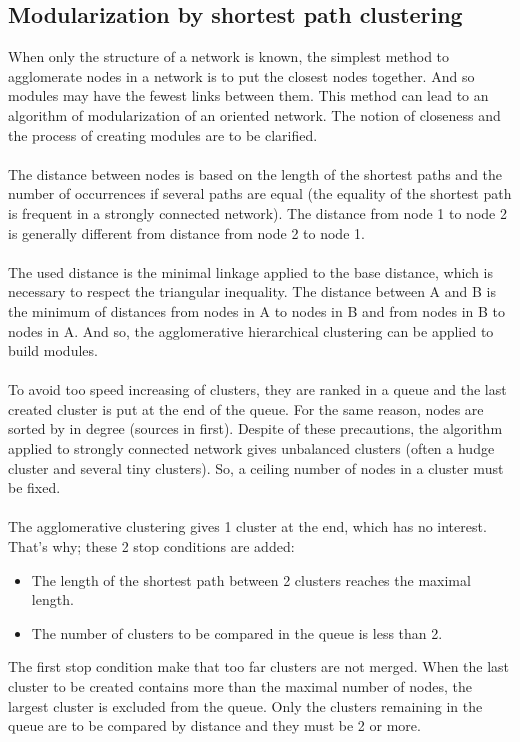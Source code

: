 \subsection{Modularization by shortest path clustering}\label{Agglomeration_by_shortest_path}
When only the structure of a network is known, the simplest method to agglomerate nodes in a network is to put the closest nodes together. And so modules may have the fewest links between them. This method can lead to an algorithm of modularization of an oriented network. The notion of closeness and the process of creating modules are to be clarified.\\\\
The distance between nodes is based on the length of the shortest paths and the number of occurrences if several paths are equal (the equality of the shortest path is frequent in a strongly connected network). The distance from node 1 to node 2 is generally different from distance from node 2 to node 1.\\\\
The used distance is the minimal linkage applied to the base distance, which is necessary to respect the triangular inequality. The distance between A and B is the minimum of distances from nodes in A to nodes in B and from nodes in B to nodes in A. And so, the agglomerative hierarchical clustering can be applied to build modules.\\\\
To avoid too speed increasing of clusters, they are ranked in a queue and the last created cluster is put at the end of the queue. For the same reason, nodes are sorted by in degree (sources in first). Despite of these precautions, the algorithm applied to strongly connected network gives unbalanced clusters (often a hudge cluster and several tiny clusters). So, a ceiling number of nodes in a cluster must be fixed.\\\\
The agglomerative clustering gives 1 cluster at the end, which has no interest. That’s why; these 2 stop conditions are added:
\begin{itemize}
\item The length of the shortest path between 2 clusters reaches the maximal length.
\item The number of clusters to be compared in the queue is less than 2.
\end{itemize}
The first stop condition make that too far clusters are not merged. When the last cluster to be created contains more than the maximal number of nodes, the largest cluster is excluded from the queue. Only the clusters remaining in the queue are to be compared by distance and they must be 2 or more.\\\\
